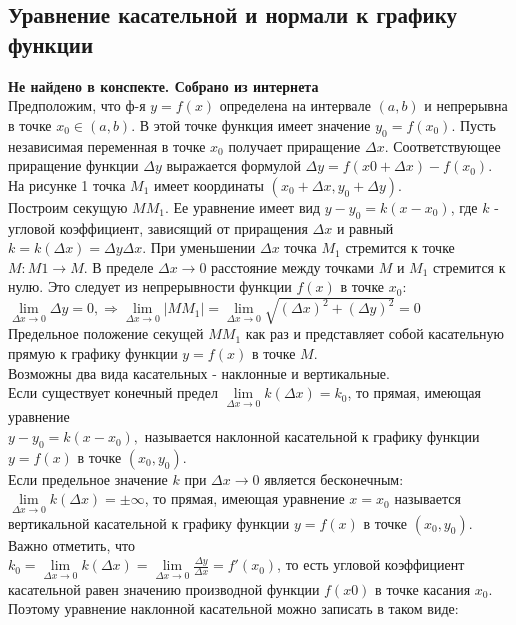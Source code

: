 \documentclass[oneside]{book}
\begin{document}
\begin{enumerate}
\chapter{Уравнение касательной и нормали к графику функции}
\textbf{Не найдено в конспекте. Собрано из интернета}\\
Предположим, что ф-я $y=f(x)$ определена на интервале $(a,b)$ и непрерывна в точке $x_0 \in (a,b)$. В этой точке функция имеет значение $y_0=f(x_0)$.
Пусть независимая переменная в точке $x_0$ получает приращение $\Delta x$. Соответствующее приращение функции $\Delta y$ выражается формулой $\Delta y = f(x0+ \Delta x) - f(x_0)$.
На рисунке 1 точка $M_1$ имеет координаты $(x_0+\Delta x,y_0+\Delta y)$.\\
 Построим секущую $MM_1$. Ее уравнение имеет вид $y - y_0=k(x-x_0)$, где $k$ - угловой коэффициент, зависящий от приращения $\Delta x$
   и равный $k=k(\Delta x)=\Delta y\Delta x$. При уменьшении $\Delta x$ точка $M_1$ стремится к точке $M: M1\rightarrow M$. В пределе $\Delta x\rightarrow 0$ расстояние между точками $M$ и $M_1$ стремится к нулю. Это следует из непрерывности функции $f(x)$ в точке $x_0$:\\
   $\lim \limits_{\Delta x \rightarrow 0}\Delta y = 0, \Rightarrow \lim \limits_{\Delta x \rightarrow 0}|MM_1|=\lim \limits_{\Delta x \rightarrow 0}\sqrt{(\Delta x)^2 + (\Delta y)^2}=0$\\
   Предельное положение секущей $MM_1$ как раз и представляет собой касательную прямую к графику функции $y=f(x)$ в точке $M$.\\
   Возможны два вида касательных - наклонные и вертикальные. \\
   Если существует конечный предел $\lim \limits_{\Delta x \rightarrow 0}k(\Delta x)=k_0$, то прямая, имеющая уравнение\\
   $y-y_0=k(x-x_0),$ называется наклонной касательной к графику функции $y=f(x)$ в точке $(x_0,y_0)$.\\
   Если предельное значение $k$ при $\Delta x\rightarrow 0$ является бесконечным: $\lim \limits_{\Delta x \rightarrow 0}k(\Delta x)=\pm \infty$, то прямая, имеющая уравнение $x=x_0$ называется вертикальной касательной к графику функции $y=f(x)$ в точке $(x_0,y_0)$.\\
   Важно отметить, что 
   \\$k_0=\lim \limits_{\Delta x \rightarrow 0}k(\Delta x)=\lim \limits_{\Delta x \rightarrow 0}\frac{\Delta y}{\Delta x}=f'(x_0)$, то есть угловой коэффициент касательной равен значению производной функции $f(x0)$ в точке касания $x_0$. Поэтому уравнение наклонной касательной можно записать в таком виде: \\

\end{enumerate}
\end{document}
